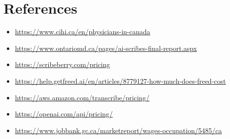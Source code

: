 \documentclass[11pt]{article}
\begin{document}
\section*{References}
\begin{itemize}
\item \url{https://www.cihi.ca/en/physicians-in-canada}
\item \url{https://www.ontariomd.ca/pages/ai-scribes-final-report.aspx}
\item \url{https://scribeberry.com/pricing}
\item \url{https://help.getfreed.ai/en/articles/8779127-how-much-does-freed-cost}
\item \url{https://aws.amazon.com/transcribe/pricing/}
\item \url{https://openai.com/api/pricing/}
\item \url{https://www.jobbank.gc.ca/marketreport/wages-occupation/5485/ca}
\end{itemize}
\end{document}
